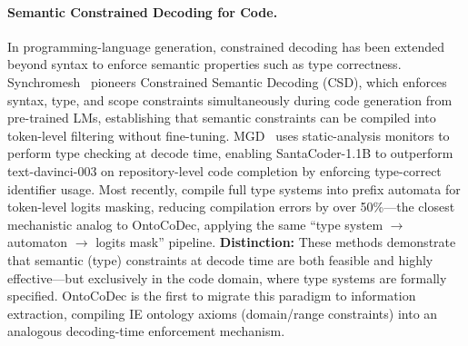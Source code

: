 \paragraph{Semantic Constrained Decoding for Code.}
In programming-language generation, constrained decoding has been extended beyond syntax to enforce semantic properties such as type correctness.
%
Synchromesh~\cite{synchromesh_iclr2022} pioneers Constrained Semantic Decoding (CSD), which enforces syntax, type, and scope constraints simultaneously during code generation from pre-trained LMs, establishing that semantic constraints can be compiled into token-level filtering without fine-tuning.
%
MGD~\cite{mgd_neurips2023} uses static-analysis monitors to perform type checking at decode time, enabling SantaCoder-1.1B to outperform text-davinci-003 on repository-level code completion by enforcing type-correct identifier usage.
%
Most recently, \citet{pldi2025_type_constrained_codegen} compile full type systems into prefix automata for token-level logits masking, reducing compilation errors by over 50\%---the closest mechanistic analog to OntoCoDec, applying the same ``type system $\to$ automaton $\to$ logits mask'' pipeline.
%
\textbf{Distinction:} These methods demonstrate that semantic (type) constraints at decode time are both feasible and highly effective---but exclusively in the code domain, where type systems are formally specified. OntoCoDec is the first to migrate this paradigm to information extraction, compiling IE ontology axioms (domain/range constraints) into an analogous decoding-time enforcement mechanism.


